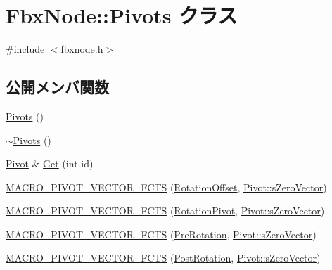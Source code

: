 \hypertarget{class_fbx_node_1_1_pivots}{}\section{Fbx\+Node\+:\+:Pivots クラス}
\label{class_fbx_node_1_1_pivots}


{\ttfamily \#include $<$fbxnode.\+h$>$}

\subsection*{公開メンバ関数}
\begin{DoxyCompactItemize}
\item 
\hyperlink{class_fbx_node_1_1_pivots_a41cd73917c09aaffe0af873d4e9d86b8}{Pivots} ()
\item 
\hyperlink{class_fbx_node_1_1_pivots_af7ab98cdaa9503fdb570ff1cd0ec67a4}{$\sim$\+Pivots} ()
\item 
\hyperlink{class_fbx_node_1_1_pivot}{Pivot} \& \hyperlink{class_fbx_node_1_1_pivots_a1ae16796ba3d563384aa142bc6f4268c}{Get} (int id)
\item 
\hyperlink{class_fbx_node_1_1_pivots_a2792ede6f8538e34549942de63d5cb7d}{M\+A\+C\+R\+O\+\_\+\+P\+I\+V\+O\+T\+\_\+\+V\+E\+C\+T\+O\+R\+\_\+\+F\+C\+TS} (\hyperlink{class_fbx_node_a2e5e9ab154369d18c2495b52990436ea}{Rotation\+Offset}, \hyperlink{class_fbx_node_1_1_pivot_a5bcef181b0b941f66222adb91896ff2c}{Pivot\+::s\+Zero\+Vector})
\item 
\hyperlink{class_fbx_node_1_1_pivots_aaeaa6d50b91ba5b66457e093ffc8c0cf}{M\+A\+C\+R\+O\+\_\+\+P\+I\+V\+O\+T\+\_\+\+V\+E\+C\+T\+O\+R\+\_\+\+F\+C\+TS} (\hyperlink{class_fbx_node_ad9175d66436673534fda8fa58d457e01}{Rotation\+Pivot}, \hyperlink{class_fbx_node_1_1_pivot_a5bcef181b0b941f66222adb91896ff2c}{Pivot\+::s\+Zero\+Vector})
\item 
\hyperlink{class_fbx_node_1_1_pivots_a0dec0e9594300a33bb5ec55749c3948a}{M\+A\+C\+R\+O\+\_\+\+P\+I\+V\+O\+T\+\_\+\+V\+E\+C\+T\+O\+R\+\_\+\+F\+C\+TS} (\hyperlink{class_fbx_node_a0e0b6a0097fd99a0f3b6808e741ef23d}{Pre\+Rotation}, \hyperlink{class_fbx_node_1_1_pivot_a5bcef181b0b941f66222adb91896ff2c}{Pivot\+::s\+Zero\+Vector})
\item 
\hyperlink{class_fbx_node_1_1_pivots_aac32e89804b44d18c2bbab384c32b000}{M\+A\+C\+R\+O\+\_\+\+P\+I\+V\+O\+T\+\_\+\+V\+E\+C\+T\+O\+R\+\_\+\+F\+C\+TS} (\hyperlink{class_fbx_node_a79bbc002a7cdb919db11525831a6a469}{Post\+Rotation}, \hyperlink{class_fbx_node_1_1_pivot_a5bcef181b0b941f66222adb91896ff2c}{Pivot\+::s\+Zero\+Vector})

\end{DoxyCompactItemize}
